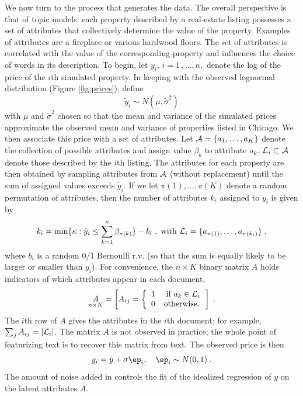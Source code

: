 \documentclass[12pt]{article}
\begin{document}
We now turn to the process that generates the data.  The overall perspective is that of topic models: each property described by a real-estate listing possesses a set of attributes that collectively determine the value of the property.   Examples of attributes are a fireplace or various hardwood floors.  The set of attributes is correlated with the value of the corresponding property and influences the choice of words in its description.  To begin, let $y_i, \, i = 1\,,\ldots, n,$ denote the log of the price of the $i$th simulated property.  In keeping with the observed lognormal distribution (Figure \ref{fig:prices}), define
\begin{equation}
	\tilde{y}_i \sim N(\mu, \tilde\sigma^2)
\end{equation}
with $\mu $ and $\tilde\sigma^2$ chosen so that the mean and variance of the simulated prices approximate the observed mean and variance of properties listed in Chicago.  We then associate this price with a set of attributes.  Let ${\cal A} = \{a_1,\ldots, a_K\}$ denote the collection of  possible attributes and assign value $\beta_k$ to attribute $a_k$.  ${\cal L}_i \subset {\cal A}$ denote those described by the $i$th listing.  The attributes for each property are then obtained by sampling attributes from $\cal A$ (without replacement) until the sum of assigned values exceeds $\tilde{y}_i$.  If we let $\pi(1), \ldots, \pi(K)$ denote a random permutation of attributes, then the number of attributes $k_i$ assigned to $y_i$ is given by
\begin{equation}
	k_i = \min \{ \kappa:  \tilde{y}_i \le \sum_{k=1}^{\kappa} \beta_{\pi(k)} \} - b_i \;,
	\mbox{ with }
	{\cal L}_i = \{a_{\pi(1)}, \ldots, a_{\pi(k_i)} \} \;,
\end{equation}
where $b_i$ is a random 0/1 Bernoulli r.v. (so that the sum is equally likely to be larger or smaller than $y_i$).  For convenience,  the $n \times K$ binary matrix $A$ holds indicators of which attributes appear in each document,
\begin{equation}
  \underset{n \times K}{A} = \left[ A_{ij} =
              \left\{ \begin{array}{cc} 1 & \mbox{ if } a_k \in {\cal L}_i \cr 0 & \mbox{otherwise.} 
                       \end{array} \right. \right]  \;.
\end{equation}
The $i$th row of $A$ gives the attributes in the $i$th document; for example, $\sum_j A_{ij} = |{\cal L}_i|$. The matrix $A$ is not observed in practice; the whole point of featurizing text is to recover this matrix from text.  The observed price is then 
\begin{equation}
	y_i = \tilde{y} + \sigma \ep_i, \quad \ep_i \sim N(0,1) \;.
\label{eq:y}
\end{equation}
The amount of noise added  in  controls the fit of the idealized regression of $y$ on the latent attributes $A$.
\end{document}
